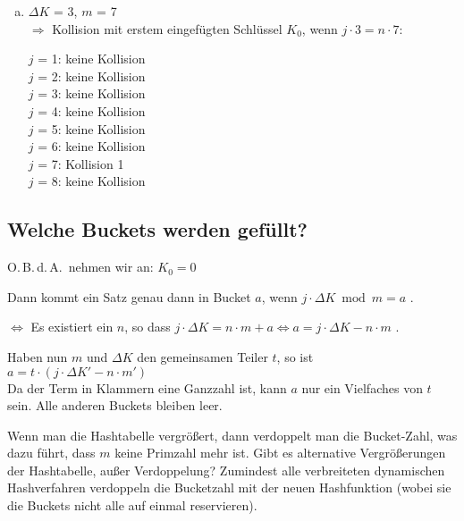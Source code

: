 \begin{solution}
\begin{enumerate}[a)]
	\item $\Delta K$ = 3, $m$ = 7 \\
	$\Rightarrow$ Kollision mit erstem eingefügten Schlüssel $K_0$, wenn $j \cdot 3 = n  \cdot 7$:

	$j$ = 1: keine Kollision \\
	$j$ = 2: keine Kollision \\
	$j$ = 3: keine Kollision \\
	$j$ = 4: keine Kollision \\
	$j$ = 5: keine Kollision \\
	$j$ = 6: keine Kollision \\
	$j$ = 7: Kollision 1 \\
	$j$ = 8: keine Kollision \\
\end{enumerate}

\subsection{\color{solutioncolor}Welche Buckets werden gefüllt?}

O.\,B.\,d.\,A.\ nehmen wir an: $K_0 = 0$

Dann kommt ein Satz genau dann in Bucket $a$, wenn
$j \cdot \Delta K \bmod m = a$ .

$\Leftrightarrow$ Es existiert ein $n$, so dass $j \cdot \Delta K = n  \cdot m + a\Leftrightarrow a = j  \cdot \Delta K - n \cdot m$ .

Haben nun $m$ und $\Delta K$ den gemeinsamen Teiler $t$, so ist $a = t \cdot (j \cdot \Delta K' - n \cdot m')$ \\
Da der Term in Klammern eine Ganzzahl ist, kann $a$ nur ein Vielfaches von $t$ sein. Alle anderen Buckets bleiben leer.
\end{solution}

\begin{note}
Wenn man die Hashtabelle vergrößert, dann verdoppelt man die Bucket-Zahl, was dazu führt, dass $m$ keine Primzahl mehr ist. Gibt es alternative Vergrößerungen der Hashtabelle, außer Verdoppelung? Zumindest alle verbreiteten dynamischen Hashverfahren verdoppeln die Bucketzahl mit der neuen Hashfunktion (wobei sie die Buckets nicht alle auf einmal reservieren).
\end{note}
